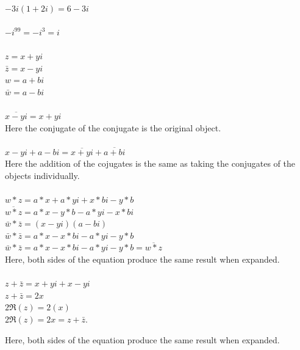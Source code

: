 \documentclass[12pt]{article}
\begin{document}
\\
$-3i(1+2i) = 6-3i$\\

\\
$-i^{99} = -i^3 = i$\\

\\

$z = x + yi$\\
$\bar{z} = x - yi$\\
$w = a + bi$\\
$\bar{w} = a - bi$\\


\\

$\overline{x-yi} = x + yi$\\
Here the conjugate of the conjugate is the original object.\\

\\
$x-yi+a-bi = \overline{x+yi} + \overline{a+bi}$\\
Here the addition of the cojugates is the same as taking the conjugates of the objects individually.\\

\\
$w*z = a*x + a*yi + x*bi - y*b$ \\


$\overline{w*z} = a*x - y*b - a*yi - x*bi$\\

$\bar{w} * \bar{z} = (x-yi)(a-bi)$\\
$\bar{w} * \bar{z} = a*x - x*bi - a*yi - y*b$\\
$\bar{w} * \bar{z} = a*x - x*bi - a*yi - y*b = \overline{w*z}$\\

Here, both sides of the equation produce the same result when expanded.\\


\\
$z + \bar{z} = x + yi + x - yi$\\
$z + \bar{z} = 2x$\\
$2\Re(z) = 2(x)$\\

$2\Re(z) = 2x = z + \bar{z}$.

Here, both sides of the equation produce the same result when expanded.\\
\end{document}
